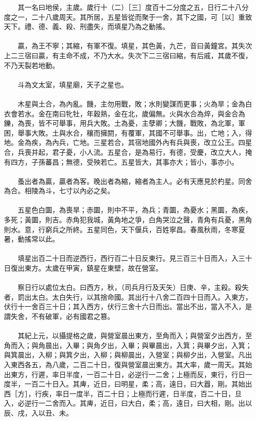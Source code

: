 　　其一名曰地侯，主歲。歲行十（二）［三］度百十二分度之五，日行二十八分度之一，二十八歲周天。其所居，五星皆從而聚于一舍，其下之國，可［以］重致天下。禮、德、義、殺、刑盡失，而填星乃為之動搖。
\\\\
　　贏，為王不寧；其縮，有軍不復。填星，其色黃，九芒，音曰黃鐘宮。其失次上二三宿曰贏，有主命不成，不乃大水。失次下二三宿曰縮，有后戚，其歲不復，不乃天裂若地動。
\\\\
　　斗為文太室，填星廟，天子之星也。
\\\\
　　木星與土合，為內亂。饑，主勿用戰，敗；水則變謀而更事；火為旱；金為白衣會若水。金在南曰牝牡，年穀熟，金在北，歲偏無。火與水合為焠，與金合為鑠，為喪，皆不可舉事，用兵大敗。土為憂，主孽卿；大饑，戰敗，為北軍，軍困，舉事大敗。土與水合，穰而擁閼，有覆軍，其國不可舉事。出，亡地；入，得地。金為疾，為內兵，亡地。三星若合，其宿地國外內有兵與喪，改立公王。四星合，兵喪并起，君子憂，小人流。五星合，是為易行，有德，受慶，改立大人，掩有四方，子孫蕃昌；無德，受殃若亡。五星皆大，其事亦大；皆小，事亦小。
\\\\
　　蚤出者為贏，贏者為客。晚出者為縮，縮者為主人。必有天應見於杓星。同舍為合。相陵為斗，七寸以內必之矣。
\\\\
　　五星色白圜，為喪旱；赤圜，則中不平，為兵；青圜，為憂水；黑圜，為疾，多死；黃圜，則吉。赤角犯我城，黃角地之爭，白角哭泣之聲，青角有兵憂，黑角則水。意，行窮兵之所終。五星同色，天下偃兵，百姓寧昌。春風秋雨，冬寒夏暑，動搖常以此。
\\\\
　　填星出百二十日而逆西行，西行百二十日反東行。見三百三十日而入，入三十日復出東方。太歲在甲寅，鎮星在東壁，故在營室。
\\\\
　　察日行以處位太白。曰西方，秋，（司兵月行及天矢）日庚、辛，主殺。殺失者，罰出太白。太白失行，以其捨命國。其出行十八舍二百四十日而入。入東方，伏行十一舍百三十日；其入西方，伏行三舍十六日而出。當出不出，當入不入，是謂失舍，不有破軍，必有國君之篡。
\\\\
　　其紀上元，以攝提格之歲，與營室晨出東方，至角而入；與營室夕出西方，至角而入；與角晨出，入畢；與角夕出，入畢；與畢晨出，入箕；與畢夕出，入箕；與箕晨出，入柳；與箕夕出，入柳；與柳晨出，入營室；與柳夕出，入營室。凡出入東西各五，為八歲，二百二十日，復與營室晨出東方。其大率，歲一周天。其始出東方，行遲，率日半度，一百二十日，必逆行一二舍；上極而反，東行，行日一度半，一百二十日入。其庳，近日，曰明星，柔；高，遠日，曰大囂，剛。其始出西［方］，行疾，率日一度半，百二十日；上極而行遲，日半度，百二十日，旦入，必逆行一二舍而入。其庳，近日，曰大白，柔；高，遠日，曰大相，剛。出以辰、戌，入以丑、未。
